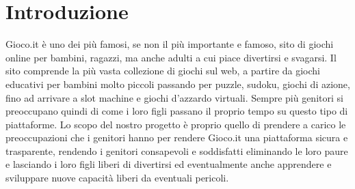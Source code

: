 \documentclass[../Report.tex]{subfiles}
\begin{document}
    \chapter{Introduzione}
    Gioco.it è uno dei più famosi, se non il più importante e famoso, sito di giochi online per bambini, ragazzi, ma anche adulti a cui piace divertirsi e svagarsi. Il sito comprende la più vasta collezione di giochi sul web, a partire da giochi educativi per bambini molto piccoli passando per puzzle, sudoku, giochi di azione, fino ad arrivare a slot machine e giochi d'azzardo virtuali. Sempre più genitori si preoccupano quindi di come i loro figli passano il proprio tempo su questo tipo di piattaforme. Lo scopo del nostro progetto è proprio quello di prendere a carico le preoccupazioni che i genitori hanno per rendere Gioco.it una piattaforma sicura e trasparente, rendendo i genitori consapevoli e soddisfatti eliminando le loro paure e lasciando i loro figli liberi di divertirsi ed eventualmente anche apprendere e sviluppare nuove capacità liberi da eventuali pericoli. 
\end{document}
